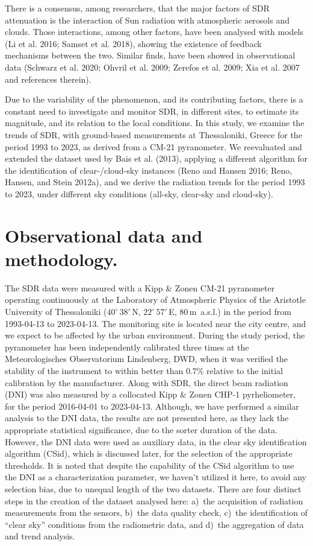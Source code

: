 \documentclass[
  preprint, 3p, authoryear]{article}
\begin{document}
There is a consensus, among researchers, that the major factors of SDR attenuation is the interaction of Sun radiation with atmospheric aerosols and clouds.
Those interactions, among other factors, have been analysed with models (Li et al. 2016; Samset et al. 2018), showing the existence of feedback mechanisms between the two.
Similar finds, have been showed in observational data (Schwarz et al. 2020; Ohvril et al. 2009; Zerefos et al. 2009; Xia et al. 2007 and references therein).

Due to the variability of the phenomenon, and its contributing factors, there is a constant need to investigate and monitor SDR, in different sites, to estimate its magnitude, and its relation to the local conditions.
In this study, we examine the trends of SDR, with ground-based measurements at Thessaloniki, Greece for the period 1993 to 2023, as derived from a CM-21 pyranometer.
We reevaluated and extended the dataset used by Bais et al. (2013), applying a different algorithm for the identification of clear-/cloud-sky instances (Reno and Hansen 2016; Reno, Hansen, and Stein 2012a), and we derive the radiation trends for the period 1993 to 2023, under different sky conditions (all-sky, clear-sky and cloud-sky).

\hypertarget{observational-data-and-methodology.}{%
\section{Observational data and methodology.}\label{observational-data-and-methodology.}}

The SDR data were measured with a Kipp \& Zonen CM-21 pyranometer operating continuously at the Laboratory of Atmospheric Physics of the Aristotle University of Thessaloniki
(\(40^\circ\,38'\,\)N, \(22^\circ\,57'\,\)E, \(80\,\)m~a.s.l.)
in the period from
1993-04-13
to
2023-04-13.
The monitoring site is located near the city centre, and we expect to be affected by the urban environment.
During the study period, the pyranometer has been independently calibrated three times at the Meteorologisches Observatorium Lindenberg, DWD, when it was verified the stability of the instrument to within better than \(0.7\%\) relative to the initial calibration by the manufacturer.
Along with SDR, the direct beam radiation (DNI) was also measured by a collocated Kipp \& Zonen CHP-1 pyrheliometer, for the period
2016-04-01
to
2023-04-13.
Although, we have performed a similar analysis to the DNI data, the results are not presented here, as they lack the appropriate statistical significance, due to the sorter duration of the data.
However, the DNI data were used as auxiliary data, in the clear sky identification algorithm (CSid), which is discussed later, for the selection of the appropriate thresholds.
It is noted that despite the capability of the CSid algorithm to use the DNI as a characterization parameter, we haven't utilized it here, to avoid any selection bias, due to unequal length of the two datasets.
There are four distinct steps in the creation of the dataset analysed here:
a)~the acquisition of radiation measurements from the sensors,
b)~the data quality check,
c)~the identification of ``clear sky'' conditions from the radiometric data, and
d)~the aggregation of data and trend analysis.
\end{document}
